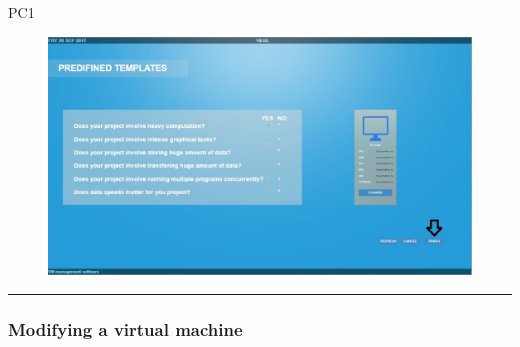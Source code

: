 \begin{lyxlist}{PC1}
\begin{figure}[H]
\centering
\includegraphics[width=170mm]{images/createVMTemp5.eps}
\caption{\label{overflow}}
\end{figure}

\end{lyxlist}
\hrule
\vspace{0.5cm}








\subsubsection{Modifying a virtual machine}

